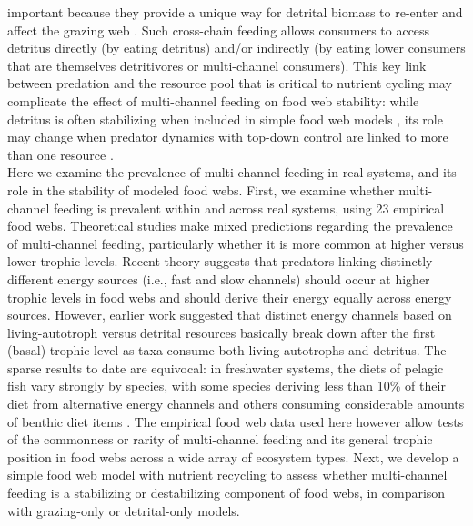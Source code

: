 \documentclass[12pt,a4paper,oneside]{article}
\begin{document}
important because they provide a unique way for detrital
biomass to re-enter and affect the grazing web \citep{Polis:1996}. Such cross-chain feeding allows consumers to access detritus
directly (by eating detritus) and/or indirectly (by eating lower consumers
that are themselves detritivores or multi-channel consumers). This key link between
predation and the resource pool that is critical to nutrient cycling may
complicate the effect of multi-channel feeding on food web
stability: while detritus is often stabilizing when included in simple
food web models \citep{Moore:2004}, its role may change when predator
dynamics with top-down control are linked to more than one resource \citep{Holt:1994}.
\\
\indent Here we examine the prevalence of multi-channel feeding in real systems, and its role in the stability of modeled food webs. First, we examine whether multi-channel feeding is prevalent within and across real systems, using 23 empirical food
webs. Theoretical studies make mixed predictions regarding the
prevalence of multi-channel feeding, particularly whether it is more common at
higher versus lower trophic levels. Recent theory suggests that predators linking distinctly different energy
sources (i.e., fast and slow channels) should occur at higher trophic levels in food webs
\citep{Rooney:2006} and should derive their energy equally
across energy sources. However, earlier work suggested that distinct energy channels
based on living-autotroph versus detrital resources basically
break down after the first (basal) trophic level 
\citep{Odum:1984,Moore:1988ar,Moore:1988} as taxa consume both
living autotrophs and detritus. The sparse results to date are equivocal: in freshwater systems, the diets of
pelagic fish vary strongly by species, with some species deriving less
than 10\% of their diet from
alternative energy channels and others consuming considerable amounts
of benthic diet items \citep{Vander-Zanden:2002}. The empirical food web
data used here however allow tests of the commonness or rarity of
multi-channel feeding and its general trophic position in food webs across a wide array of ecosystem types. Next, we develop a simple food web model with nutrient
recycling to assess whether multi-channel feeding is a stabilizing or destabilizing component of food webs, in comparison with grazing-only or detrital-only models.
\\
\\
\\
\end{document}
